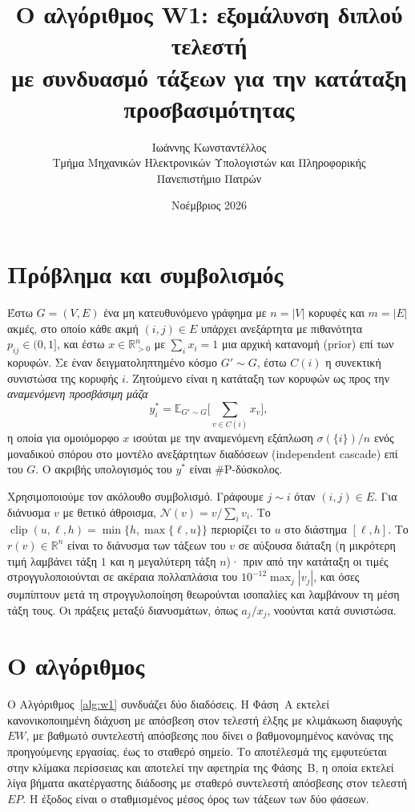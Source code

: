 \documentclass[11pt,a4paper]{article}
\title{\textbf{Ο αλγόριθμος W1: εξομάλυνση διπλού τελεστή\\ με συνδυασμό τάξεων για την κατάταξη προσβασιμότητας}}
\author{Ιωάννης Κωνσταντέλλος\\[2pt]
\small Τμήμα Μηχανικών Ηλεκτρονικών Υπολογιστών και Πληροφορικής\\
\small Πανεπιστήμιο Πατρών}
\date{Νοέμβριος 2026}
\newcommand{\N}{\mathcal{N}}
\DeclareMathOperator{\clip}{clip}
\begin{document}
\maketitle

\section{Πρόβλημα και συμβολισμός}

Έστω $G=(V,E)$ ένα μη κατευθυνόμενο γράφημα με $n=|V|$ κορυφές και $m=|E|$ ακμές, στο οποίο κάθε ακμή $(i,j)\in E$ υπάρχει ανεξάρτητα με πιθανότητα $p_{ij}\in(0,1]$, και έστω $x\in\mathbb{R}^n_{>0}$ με $\sum_i x_i=1$ μια αρχική κατανομή (prior) επί των κορυφών. Σε έναν δειγματοληπτημένο κόσμο $G'\sim G$, έστω $C(i)$ η συνεκτική συνιστώσα της κορυφής $i$. Ζητούμενο είναι η κατάταξη των κορυφών ως προς την \emph{αναμενόμενη προσβάσιμη μάζα}
\[
y^*_i=\mathbb{E}_{G'\sim G}\Big[\sum_{v\in C(i)}x_v\Big],
\]
η οποία για ομοιόμορφο $x$ ισούται με την αναμενόμενη εξάπλωση $\sigma(\{i\})/n$ ενός μοναδικού σπόρου στο μοντέλο ανεξάρτητων διαδόσεων (independent cascade) επί του $G$. Ο ακριβής υπολογισμός του $y^*$ είναι \#P-δύσκολος.

Χρησιμοποιούμε τον ακόλουθο συμβολισμό. Γράφουμε $j\sim i$ όταν $(i,j)\in E$. Για διάνυσμα $v$ με θετικό άθροισμα, $\N(v)=v/\sum_i v_i$. Το $\clip(u,\ell,h)=\min\{h,\max\{\ell,u\}\}$ περιορίζει το $u$ στο διάστημα $[\ell,h]$. Το $r(v)\in\mathbb{R}^n$ είναι το διάνυσμα των τάξεων του $v$ σε αύξουσα διάταξη (η μικρότερη τιμή λαμβάνει τάξη $1$ και η μεγαλύτερη τάξη $n$)· πριν από την κατάταξη οι τιμές στρογγυλοποιούνται σε ακέραια πολλαπλάσια του $10^{-12}\max_j|v_j|$, και όσες συμπίπτουν μετά τη στρογγυλοποίηση θεωρούνται ισοπαλίες και λαμβάνουν τη μέση τάξη τους. Οι πράξεις μεταξύ διανυσμάτων, όπως $a_j/x_j$, νοούνται κατά συνιστώσα.

\section{Ο αλγόριθμος}

Ο Αλγόριθμος~\ref{alg:w1} συνδυάζει δύο διαδόσεις. Η Φάση~Α εκτελεί κανονικοποιημένη διάχυση με απόσβεση στον τελεστή έλξης με κλιμάκωση διαφυγής $EW$, με βαθμωτό συντελεστή απόσβεσης που δίνει ο βαθμονομημένος κανόνας της προηγούμενης εργασίας, έως το σταθερό σημείο. Το αποτέλεσμά της εμφυτεύεται στην κλίμακα περίσσειας και αποτελεί την αφετηρία της Φάσης~Β, η οποία εκτελεί λίγα βήματα ακατέργαστης διάδοσης με σταθερό συντελεστή απόσβεσης στον τελεστή $EP$. Η έξοδος είναι ο σταθμισμένος μέσος όρος των τάξεων των δύο φάσεων.
\end{document}
